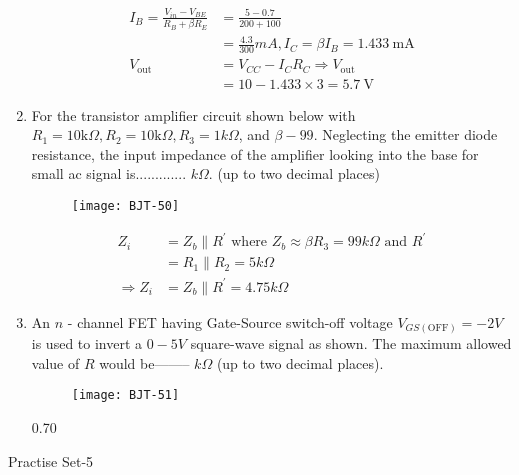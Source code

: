 \begin{enumerate}
\begin{answer}
\begin{align*}
I_{B}=\frac{V_{i n}-V_{B E}}{R_{B}+\beta R_{E}}&=\frac{5-0.7}{200+100}\\&=\frac{4.3}{300} m A, I_{C}=\beta I_{B}=1.433 \mathrm{~mA}\\
V_{\text {out }}&=V_{C C}-I_{C} R_{C} \Rightarrow V_{\text {out }}\\&=10-1.433 \times 3=5.7 \mathrm{~V}
\end{align*}
\end{answer}
	\item For the transistor amplifier circuit shown below with $R_{1}=10 \mathrm{k} \Omega, R_{2}=10 \mathrm{k} \Omega, R_{3}=1 k \Omega$, and $\beta-99$. Neglecting the emitter diode resistance, the input impedance of the amplifier looking into the base for small ac signal is............. $k \Omega$. (up to two decimal places)
{	}
\begin{figure}[H]
\centering
\texttt{[image: BJT-50]}
\end{figure}
\begin{answer}
\begin{align*}
Z_{i}&=Z_{b} \| R^{\prime}\text{ where }Z_{b} \approx \beta R_{3}=99 k \Omega\text{ and } R^{\prime}\\&=R_{1} \| R_{2}=5 k \Omega\\
\Rightarrow Z_{i}&=Z_{b} \| R^{\prime}=4.75 k \Omega
\end{align*}
\end{answer}
\item An $n$ - channel FET having Gate-Source switch-off voltage $V_{G S(\mathrm{OFF})}=-2 V$ is used to invert a $0-5 V$ square-wave signal as shown. The maximum allowed value of $R$ would be-------- $k \Omega$ (up to two decimal places).
{}
\begin{figure}[H]
\centering
\texttt{[image: BJT-51]}
\end{figure}
\begin{answer}
0.70
\end{answer}
\end{enumerate}
\newpage
\begin{abox}
	Practise Set-5
\end{abox}
